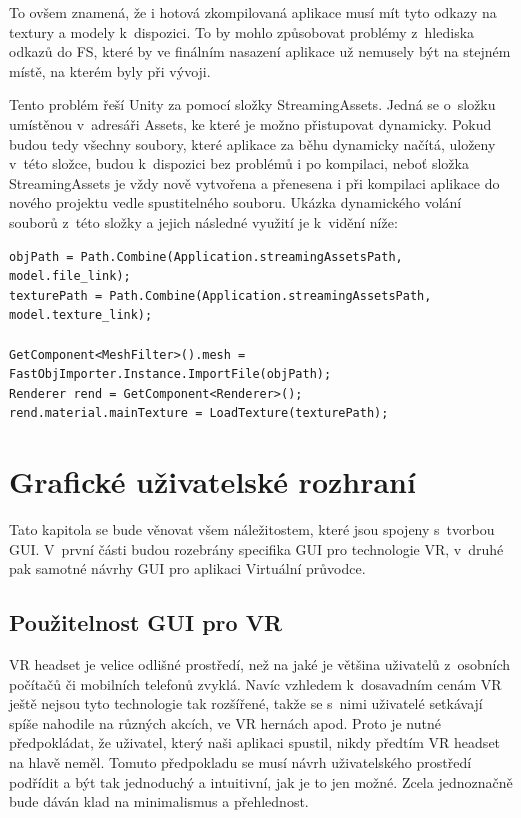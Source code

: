 \documentclass[thesis=B,czech]{FITthesis}[2012/06/26]
\begin{document}
To ovšem znamená, že i hotová zkompilovaná aplikace musí mít tyto odkazy na textury a modely k~dispozici. To by mohlo způsobovat problémy z~hlediska odkazů do FS, které by ve finálním nasazení aplikace už nemusely být na stejném místě, na kterém byly při vývoji.

Tento problém řeší Unity za pomocí složky StreamingAssets. Jedná se o~složku umístěnou v~adresáři Assets, ke které je možno přistupovat dynamicky. Pokud budou tedy všechny soubory, které aplikace za běhu dynamicky načítá, uloženy v~této složce, budou k~dispozici bez problémů i po kompilaci, neboť složka StreamingAssets je vždy nově vytvořena a přenesena i při kompilaci aplikace do nového projektu vedle spustitelného souboru. Ukázka dynamického volání souborů z~této složky a jejich následné využití je k~vidění níže:

\begin{lstlisting}[frame=single]
objPath = Path.Combine(Application.streamingAssetsPath, model.file_link);
texturePath = Path.Combine(Application.streamingAssetsPath, model.texture_link);

GetComponent<MeshFilter>().mesh = FastObjImporter.Instance.ImportFile(objPath);
Renderer rend = GetComponent<Renderer>();
rend.material.mainTexture = LoadTexture(texturePath);
\end{lstlisting}


	\section{Grafické uživatelské rozhraní}
	\label{sec:GUI}
	
	Tato kapitola se bude věnovat všem náležitostem, které jsou spojeny s~tvorbou GUI. V~první části budou rozebrány specifika GUI pro technologie VR, v~druhé pak samotné návrhy GUI pro aplikaci Virtuální průvodce.
	
	
	\subsection{Použitelnost GUI pro VR}
VR headset je velice odlišné prostředí, než na jaké je většina uživatelů z~osobních počítačů či mobilních telefonů zvyklá. Navíc vzhledem k~dosavadním cenám VR ještě nejsou tyto technologie tak rozšířené, takže se s~nimi uživatelé setkávají spíše nahodile na různých akcích, ve VR hernách apod. Proto je nutné předpokládat, že uživatel, který naši aplikaci spustil, nikdy předtím VR headset na hlavě neměl. Tomuto předpokladu se musí návrh uživatelského prostředí podřídit a být tak jednoduchý a intuitivní, jak je to jen možné. Zcela jednoznačně bude dáván klad na minimalismus a přehlednost.
	
\end{document}
